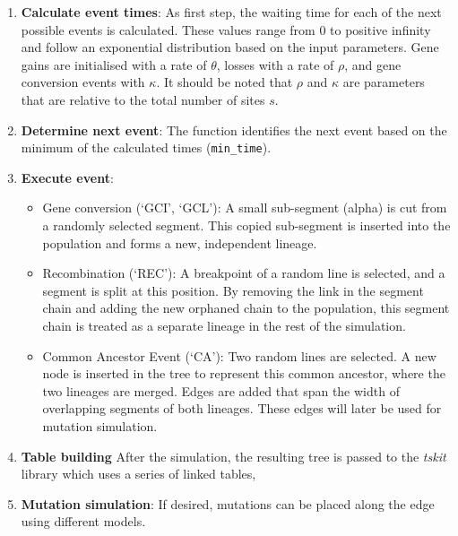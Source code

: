 \begin{enumerate}
      \item \textbf{Calculate event times}: As first step, the waiting time for each of the next possible events is calculated.
            These values range from 0 to positive infinity and follow an exponential distribution based on the input parameters.
            Gene gains are initialised with a rate of $\theta$, losses with a rate of $\rho$, and gene conversion events with $\kappa$.
            It should be noted that $\rho$ and $\kappa$ are parameters that are relative to the total number of sites $s$.
      \item \textbf{Determine next event}: The function identifies the next event based on the minimum of the calculated times (\texttt{min_time}).
      \item \textbf{Execute event}:
            \begin{itemize}
                  \item Gene conversion (`GCI', `GCL'): A small sub-segment (alpha) is cut from a randomly selected segment.
                        This copied sub-segment is inserted into the population and forms a new, independent lineage.
                  \item Recombination (`REC'): A breakpoint of a random line is selected, and a segment is split at this position.
                        By removing the link in the segment chain and adding the new orphaned chain to the population, this segment chain is treated as a separate lineage in the rest of the simulation.
                  \item Common Ancestor Event (`CA'): Two random lines are selected.
                        A new node is inserted in the tree to represent this common ancestor, where the two lineages are merged.
                        Edges are added that span the width of overlapping segments of both lineages.
                        These edges will later be used for mutation simulation.
            \end{itemize}
      \item \textbf{Table building} After the simulation, the resulting tree is passed to the \textit{tskit} library which uses a series of linked tables,

      \item \textbf{Mutation simulation}: If desired, mutations can be placed along the edge using different models.
\end{enumerate}
\newpage
